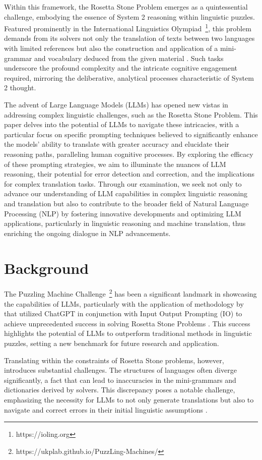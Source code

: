 \documentclass[10pt, a4paper]{article}
\begin{document}
Within this framework, the Rosetta Stone Problem emerges as a quintessential challenge, embodying the essence of System 2 reasoning within linguistic puzzles. Featured prominently in the International Linguistics Olympiad~\footnote{https://ioling.org}, this problem demands from its solvers not only the translation of texts between two languages with limited references but also the construction and application of a mini-grammar and vocabulary deduced from the given material \citep{Rosetta_IOL}. Such tasks underscore the profound complexity and the intricate cognitive engagement required, mirroring the deliberative, analytical processes characteristic of System 2 thought.

The advent of Large Language Models (LLMs) has opened new vistas in addressing complex linguistic challenges, such as the Rosetta Stone Problem. This paper delves into the potential of LLMs to navigate these intricacies, with a particular focus on specific prompting techniques believed to significantly enhance the models’ ability to translate with greater accuracy and elucidate their reasoning paths, paralleling human cognitive processes. By exploring the efficacy of these prompting strategies, we aim to illuminate the nuances of LLM reasoning, their potential for error detection and correction, and the implications for complex translation tasks. Through our examination, we seek not only to advance our understanding of LLM capabilities in complex linguistic reasoning and translation but also to contribute to the broader field of Natural Language Processing (NLP) by fostering innovative developments and optimizing LLM applications, particularly in linguistic reasoning and machine translation, thus enriching the ongoing dialogue in NLP advancements.

\section{Background}
The Puzzling Machine Challenge~\footnote{https://ukplab.github.io/PuzzLing-Machines/} has been a significant landmark in showcasing the capabilities of LLMs, particularly with the application of methodology by \citet{PuzzGPT} that utilized ChatGPT in conjunction with Input Output Prompting (IO) to achieve unprecedented success in solving Rosetta Stone Problems \citep{Puzz_Machine}. This success highlights the potential of LLMs to outperform traditional methods in linguistic puzzles, setting a new benchmark for future research and application.

Translating within the constraints of Rosetta Stone problems, however, introduces substantial challenges. The structures of languages often diverge significantly, a fact that can lead to inaccuracies in the mini-grammars and dictionaries derived by solvers. This discrepancy poses a notable challenge, emphasizing the necessity for LLMs to not only generate translations but also to navigate and correct errors in their initial linguistic assumptions \citep{Rosetta_IOL}.
\end{document}
